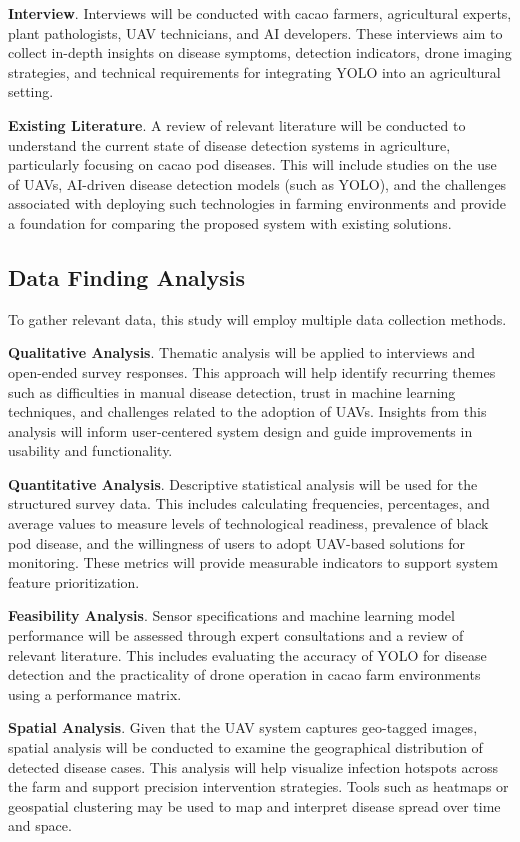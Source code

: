 \textbf{Interview}. Interviews will be conducted with cacao farmers, agricultural experts, plant pathologists, UAV technicians, and AI developers. These interviews aim to collect in-depth insights on disease symptoms, detection indicators, drone imaging strategies, and technical requirements for integrating YOLO into an agricultural setting.

\textbf{Existing Literature}. A review of relevant literature will be conducted to understand the current state of disease detection systems in agriculture, particularly focusing on cacao pod diseases. This will include studies on the use of UAVs, AI-driven disease detection models (such as YOLO), and the challenges associated with deploying such technologies in farming environments and provide a foundation for comparing the proposed system with existing solutions.

\subsection*{Data Finding Analysis}

To gather relevant data, this study will employ multiple data collection methods.

\textbf{Qualitative Analysis}. Thematic analysis will be applied to interviews and open-ended survey responses. This approach will help identify recurring themes such as difficulties in manual disease detection, trust in machine learning techniques, and challenges related to the adoption of UAVs. Insights from this analysis will inform user-centered system design and guide improvements in usability and functionality.

\textbf{Quantitative Analysis}. Descriptive statistical analysis will be used for the structured survey data. This includes calculating frequencies, percentages, and average values to measure levels of technological readiness, prevalence of black pod disease, and the willingness of users to adopt UAV-based solutions for monitoring. These metrics will provide measurable indicators to support system feature prioritization.


\textbf{Feasibility Analysis}. Sensor specifications and machine learning model performance will be assessed through expert consultations and a review of relevant literature. This includes evaluating the accuracy of YOLO for disease detection and the practicality of drone operation in cacao farm environments using a performance matrix.

\textbf{Spatial Analysis}. Given that the UAV system captures geo-tagged images, spatial analysis will be conducted to examine the geographical distribution of detected disease cases. This analysis will help visualize infection hotspots across the farm and support precision intervention strategies. Tools such as heatmaps or geospatial clustering may be used to map and interpret disease spread over time and space.

